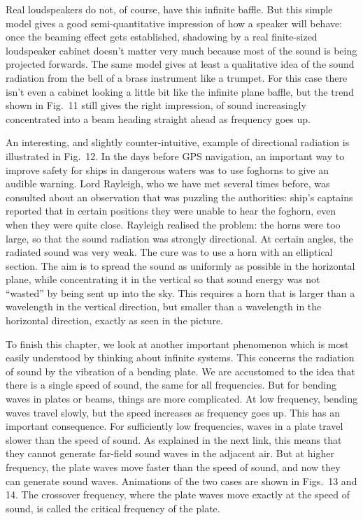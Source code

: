   Real loudspeakers do not, of course, have this infinite baffle. But this 
  simple model gives a good semi-quantitative impression of how a speaker will 
  behave: once the beaming effect gets established, shadowing by a real 
  finite-sized loudspeaker cabinet doesn't matter very much because most of the 
  sound is being projected forwards. The same model gives at least a 
  qualitative idea of the sound radiation from the bell of a brass instrument 
  like a trumpet. For this case there isn't even a cabinet looking a little bit 
  like the infinite plane baffle, but the trend shown in Fig.\ 11 still gives 
  the right impression, of sound increasingly concentrated into a beam heading 
  straight ahead as frequency goes up. 

  An interesting, and slightly counter-intuitive, example of directional 
  radiation is illustrated in Fig.\ 12. In the days before GPS navigation, an 
  important way to improve safety for ships in dangerous waters was to use 
  foghorns to give an audible warning. Lord Rayleigh, who we have met several 
  times before, was consulted about an observation that was puzzling the 
  authorities: ship's captains reported that in certain positions they were 
  unable to hear the foghorn, even when they were quite close. Rayleigh 
  realised the problem: the horns were too large, so that the sound radiation 
  was strongly directional. At certain angles, the radiated sound was very 
  weak. The cure was to use a horn with an elliptical section. The aim is to 
  spread the sound as uniformly as possible in the horizontal plane, while 
  concentrating it in the vertical so that sound energy was not ``wasted'' by 
  being sent up into the sky. This requires a horn that is larger than a 
  wavelength in the vertical direction, but smaller than a wavelength in the 
  horizontal direction, exactly as seen in the picture. 

  To finish this chapter, we look at another important phenomenon which is most 
  easily understood by thinking about infinite systems. This concerns the 
  radiation of sound by the vibration of a bending plate. We are accustomed to 
  the idea that there is a single speed of sound, the same for all frequencies. 
  But for bending waves in plates or beams, things are more complicated. At low 
  frequency, bending waves travel slowly, but the speed increases as frequency 
  goes up. This has an important consequence. For sufficiently low frequencies, 
  waves in a plate travel slower than the speed of sound. As explained in the 
  next link, this means that they cannot generate far-field sound waves in the 
  adjacent air. But at higher frequency, the plate waves move faster than the 
  speed of sound, and now they can generate sound waves. Animations of the two 
  cases are shown in Figs.\ 13 and 14. The crossover frequency, where the plate 
  waves move exactly at the speed of sound, is called the critical frequency of 
  the plate. 

